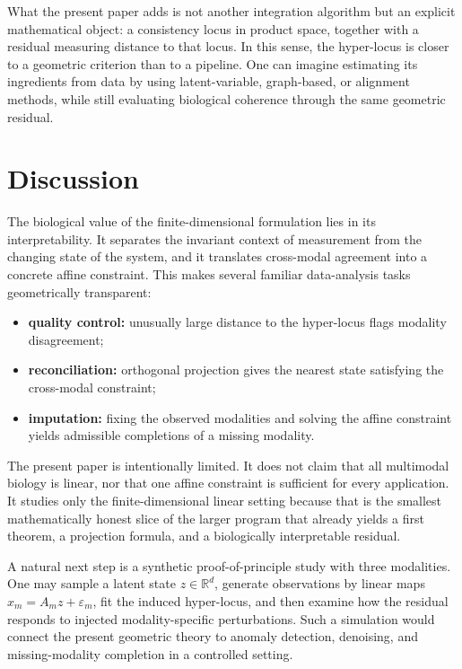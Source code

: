 \documentclass[11pt]{article}
\begin{document}
What the present paper adds is not another integration algorithm but an explicit mathematical object: a consistency locus in product space, together with a residual measuring distance to that locus. In this sense, the hyper-locus is closer to a geometric criterion than to a pipeline. One can imagine estimating its ingredients from data by using latent-variable, graph-based, or alignment methods, while still evaluating biological coherence through the same geometric residual.

\section{Discussion}

The biological value of the finite-dimensional formulation lies in its interpretability. It separates the invariant context of measurement from the changing state of the system, and it translates cross-modal agreement into a concrete affine constraint. This makes several familiar data-analysis tasks geometrically transparent:
\begin{itemize}[leftmargin=*]
    \item \textbf{quality control:} unusually large distance to the hyper-locus flags modality disagreement;
    \item \textbf{reconciliation:} orthogonal projection gives the nearest state satisfying the cross-modal constraint;
    \item \textbf{imputation:} fixing the observed modalities and solving the affine constraint yields admissible completions of a missing modality.
\end{itemize}

The present paper is intentionally limited. It does not claim that all multimodal biology is linear, nor that one affine constraint is sufficient for every application. It studies only the finite-dimensional linear setting because that is the smallest mathematically honest slice of the larger program that already yields a first theorem, a projection formula, and a biologically interpretable residual.

A natural next step is a synthetic proof-of-principle study with three modalities. One may sample a latent state $z\in\mathbb{R}^d$, generate observations by linear maps $x_m=A_m z+\varepsilon_m$, fit the induced hyper-locus, and then examine how the residual responds to injected modality-specific perturbations. Such a simulation would connect the present geometric theory to anomaly detection, denoising, and missing-modality completion in a controlled setting.
\end{document}
